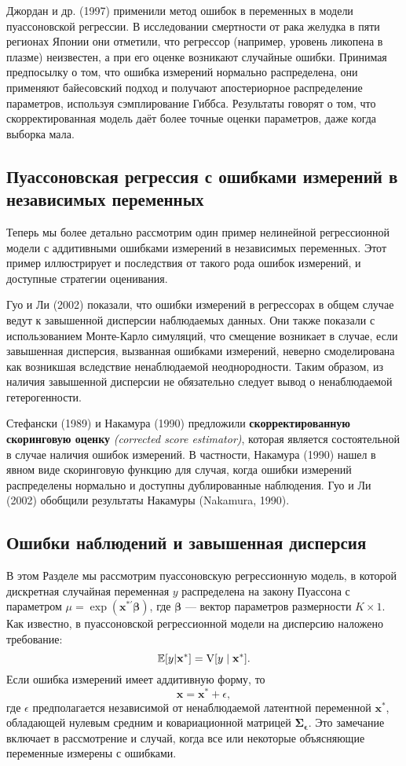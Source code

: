 Джордан и др. (1997) применили метод ошибок в переменных в модели пуассоновской регрессии. В исследовании смертности от рака желудка в пяти регионах Японии они отметили, что регрессор (например, уровень ликопена в плазме) неизвестен, а при его оценке возникают случайные ошибки. Принимая предпосылку о том, что ошибка измерений нормально распределена, они применяют байесовский подход и получают апостериорное распределение параметров, используя сэмплирование Гиббса. Результаты говорят о том, что скорректированная модель даёт более точные оценки параметров, даже когда выборка мала.

\subsection{Пуассоновская регрессия с ошибками измерений в независимых переменных} 
Теперь мы более детально рассмотрим один  пример нелинейной регрессионной модели с аддитивными ошибками измерений в независимых переменных. Этот пример иллюстрирует и последствия от такого рода ошибок измерений, и доступные стратегии оценивания.

Гуо и Ли (2002) показали, что ошибки измерений в регрессорах в общем случае ведут к завышенной дисперсии наблюдаемых данных. Они также показали с использованием Монте-Карло симуляций, что смещение возникает в случае, если завышенная дисперсия, вызванная ошибками измерений, неверно смоделирована как возникшая вследствие ненаблюдаемой неоднородности. Таким образом, из наличия завышенной дисперсии не обязательно следует вывод о ненаблюдаемой гетерогенности.

Стефански (1989) и Накамура (1990) предложили {\bf скорректированную скоринговую оценку} \emph{(corrected score estimator)}, которая является состоятельной в случае наличия ошибок измерений. В частности, Накамура (1990) нашел в явном виде скоринговую функцию  для случая, когда ошибки измерений распределены нормально и доступны дублированные наблюдения. Гуо и Ли (2002) обобщили результаты Накамуры (Nakamura, 1990).

\subsection*{Ошибки наблюдений и завышенная дисперсия} 
В этом Разделе мы рассмотрим пуассоновскую регрессионную модель, в которой дискретная случайная переменная $y$ распределена на закону Пуассона с параметром $\mu = \exp(\mathbf{x^{*\prime} \beta})$, где $\mathbf{\beta}$ --- вектор параметров размерности $K \times 1$. Как известно, в пуассоновской регрессионной модели  на дисперсию наложено требование:
\begin{equation}
\mathbb{E}[y| \mathbf{x^*}]=\mathrm{V}[y \mid  \mathbf{x^*}].
\end{equation} 
Если ошибка измерений имеет аддитивную форму, то
\[
\mathbf{x}=\mathbf{x^*}+ \epsilon,
\]
где $\epsilon$ предполагается независимой от ненаблюдаемой латентной переменной $\mathbf{x^*}$, обладающей нулевым средним и ковариационной матрицей $\mathbf{\Sigma_{\epsilon}}$. Это замечание включает в рассмотрение и случай, когда все или некоторые объясняющие переменные измерены с ошибками.


